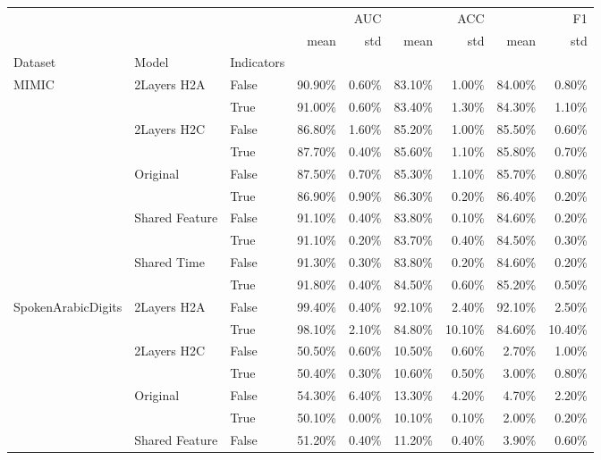 \begin{tabular}{lllrrrrrr}
\toprule
 &  &  & \multicolumn{2}{r}{AUC} & \multicolumn{2}{r}{ACC} & \multicolumn{2}{r}{F1} \\
 &  &  & mean & std & mean & std & mean & std \\
Dataset & Model & Indicators &  &  &  &  &  &  \\
\midrule
\multirow[t]{10}{*}{MIMIC} & \multirow[t]{2}{*}{2Layers H2A} & False & 90.90\% & 0.60\% & 83.10\% & 1.00\% & 84.00\% & 0.80\% \\
 &  & True & 91.00\% & 0.60\% & 83.40\% & 1.30\% & 84.30\% & 1.10\% \\
\cline{2-9}
 & \multirow[t]{2}{*}{2Layers H2C} & False & 86.80\% & 1.60\% & 85.20\% & 1.00\% & 85.50\% & 0.60\% \\
 &  & True & 87.70\% & 0.40\% & 85.60\% & 1.10\% & 85.80\% & 0.70\% \\
\cline{2-9}
 & \multirow[t]{2}{*}{Original} & False & 87.50\% & 0.70\% & 85.30\% & 1.10\% & 85.70\% & 0.80\% \\
 &  & True & 86.90\% & 0.90\% & 86.30\% & 0.20\% & 86.40\% & 0.20\% \\
\cline{2-9}
 & \multirow[t]{2}{*}{Shared Feature} & False & 91.10\% & 0.40\% & 83.80\% & 0.10\% & 84.60\% & 0.20\% \\
 &  & True & 91.10\% & 0.20\% & 83.70\% & 0.40\% & 84.50\% & 0.30\% \\
\cline{2-9}
 & \multirow[t]{2}{*}{Shared Time} & False & 91.30\% & 0.30\% & 83.80\% & 0.20\% & 84.60\% & 0.20\% \\
 &  & True & 91.80\% & 0.40\% & 84.50\% & 0.60\% & 85.20\% & 0.50\% \\
\cline{1-9} \cline{2-9}
\multirow[t]{10}{*}{SpokenArabicDigits} & \multirow[t]{2}{*}{2Layers H2A} & False & 99.40\% & 0.40\% & 92.10\% & 2.40\% & 92.10\% & 2.50\% \\
 &  & True & 98.10\% & 2.10\% & 84.80\% & 10.10\% & 84.60\% & 10.40\% \\
\cline{2-9}
 & \multirow[t]{2}{*}{2Layers H2C} & False & 50.50\% & 0.60\% & 10.50\% & 0.60\% & 2.70\% & 1.00\% \\
 &  & True & 50.40\% & 0.30\% & 10.60\% & 0.50\% & 3.00\% & 0.80\% \\
\cline{2-9}
 & \multirow[t]{2}{*}{Original} & False & 54.30\% & 6.40\% & 13.30\% & 4.20\% & 4.70\% & 2.20\% \\
 &  & True & 50.10\% & 0.00\% & 10.10\% & 0.10\% & 2.00\% & 0.20\% \\
\cline{2-9}
 & \multirow[t]{2}{*}{Shared Feature} & False & 51.20\% & 0.40\% & 11.20\% & 0.40\% & 3.90\% & 0.60\% \\

\end{tabular}
